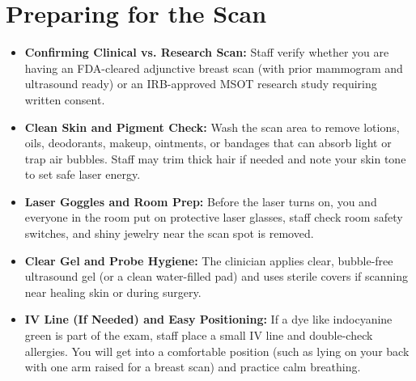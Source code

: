 \section{Preparing for the Scan}
\begin{itemize}
  \item \textbf{Confirming Clinical vs. Research Scan:} Staff verify whether you are having an FDA-cleared adjunctive breast scan (with prior mammogram and ultrasound ready) or an IRB-approved MSOT research study requiring written consent.
  \item \textbf{Clean Skin and Pigment Check:} Wash the scan area to remove lotions, oils, deodorants, makeup, ointments, or bandages that can absorb light or trap air bubbles. Staff may trim thick hair if needed and note your skin tone to set safe laser energy.
  \item \textbf{Laser Goggles and Room Prep:} Before the laser turns on, you and everyone in the room put on protective laser glasses, staff check room safety switches, and shiny jewelry near the scan spot is removed.
  \item \textbf{Clear Gel and Probe Hygiene:} The clinician applies clear, bubble-free ultrasound gel (or a clean water-filled pad) and uses sterile covers if scanning near healing skin or during surgery.
  \item \textbf{IV Line (If Needed) and Easy Positioning:} If a dye like indocyanine green is part of the exam, staff place a small IV line and double-check allergies. You will get into a comfortable position (such as lying on your back with one arm raised for a breast scan) and practice calm breathing.
\end{itemize}

